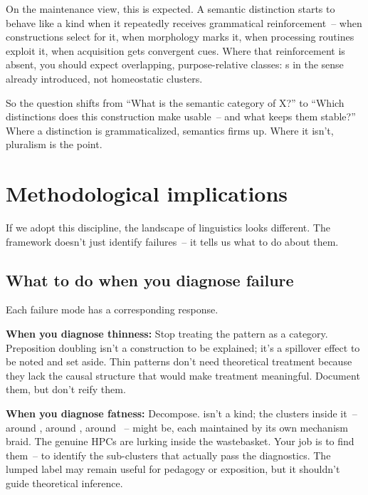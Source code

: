 On the maintenance view, this is expected. A semantic distinction starts to behave like a kind when it repeatedly receives grammatical reinforcement~-- when constructions select for it, when morphology marks it, when processing routines exploit it, when acquisition gets convergent cues. Where that reinforcement is absent, you should expect overlapping, purpose-relative classes: s in the sense already introduced, not homeostatic clusters.

So the question shifts from \enquote{What is the semantic category of X?} to \enquote{Which distinctions does this construction make usable~-- and what keeps them stable?} Where a distinction is grammaticalized, semantics firms up. Where it isn't, pluralism is the point.

\section{Methodological implications}
\label{sec:8:implications}

If we adopt this discipline, the landscape of linguistics looks different. The framework doesn't just identify failures~-- it tells us what to do about them.

\subsection{What to do when you diagnose failure}
\label{sec:8:diagnose-failure}

Each failure mode has a corresponding response.

\textbf{When you diagnose thinness:} Stop treating the pattern as a category. Preposition doubling isn't a construction to be explained; it's a spillover effect to be noted and set aside. Thin patterns don't need theoretical treatment because they lack the causal structure that would make treatment meaningful. Document them, but don't reify them.

\textbf{When you diagnose fatness:} Decompose.  isn't a kind; the clusters inside it~-- around , around , around ~-- might be, each maintained by its own mechanism braid. The genuine HPCs are lurking inside the wastebasket. Your job is to find them~-- to identify the sub-clusters that actually pass the diagnostics. The lumped label may remain useful for pedagogy or exposition, but it shouldn't guide theoretical inference.

